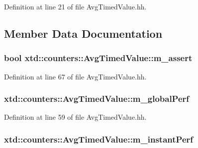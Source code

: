 Definition at line 21 of file Avg\-Timed\-Value.\-hh.



\subsection{Member Data Documentation}
\hypertarget{classxtd_1_1counters_1_1AvgTimedValue_a6e4edcfa3fcd639b23195119f2b28bd3}{
\subsubsection[{m\-\_\-assert}]{\setlength{\rightskip}{0pt plus 5cm}bool xtd\-::counters\-::\-Avg\-Timed\-Value\-::m\-\_\-assert}}\label{classxtd_1_1counters_1_1AvgTimedValue_a6e4edcfa3fcd639b23195119f2b28bd3}


Definition at line 67 of file Avg\-Timed\-Value.\-hh.

\hypertarget{classxtd_1_1counters_1_1AvgTimedValue_ad0b3148989210f269416e5af2169278e}{
\subsubsection[{m\-\_\-global\-Perf}]{ xtd\-::counters\-::\-Avg\-Timed\-Value\-::m\-\_\-global\-Perf}}\label{classxtd_1_1counters_1_1AvgTimedValue_ad0b3148989210f269416e5af2169278e}


Definition at line 59 of file Avg\-Timed\-Value.\-hh.

\hypertarget{classxtd_1_1counters_1_1AvgTimedValue_a16f6336d72850b29aa10a97d72309ec4}{
\subsubsection[{m\-\_\-instant\-Perf}]{ xtd\-::counters\-::\-Avg\-Timed\-Value\-::m\-\_\-instant\-Perf}}\label{classxtd_1_1counters_1_1AvgTimedValue_a16f6336d72850b29aa10a97d72309ec4}


